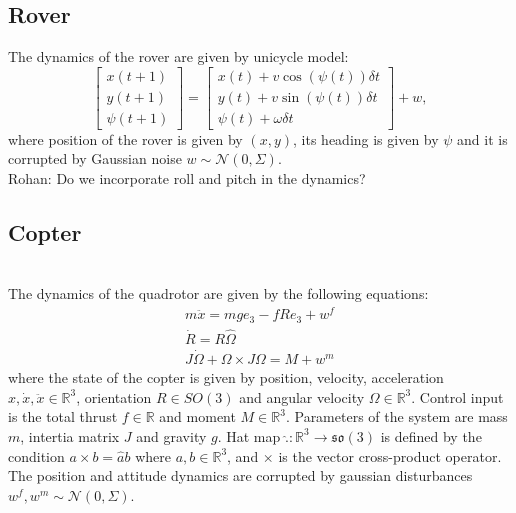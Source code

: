 \documentclass[conference]{IEEEtran}
\newcommand{\rohan}[1]{{\color{blue} Rohan: #1}}
\begin{document}
\subsection{Rover}
The dynamics of the rover are given by unicycle model:
\begin{equation}
    \begin{bmatrix}
        x(t+1) \\
        y(t+1) \\
        \psi(t+1)
    \end{bmatrix} = \begin{bmatrix}x(t) + v \cos(\psi(t)) \delta{t}\\ y(t) + v \sin(\psi(t)) \delta{t}\\ \psi(t) + \omega \delta{t} \end{bmatrix} + w,
\end{equation}
where position of the rover is given by $(x,y)$, its heading is given by $\psi$ and it is corrupted by Gaussian noise $w \sim \mathcal{N}(0,\Sigma)$. \\
\rohan{Do we incorporate roll and pitch in the dynamics?}

\subsection{Copter}
 \\
The dynamics of the quadrotor are given by the following equations:
\begin{gather}
m\ddot{x} = mge_{3} - fRe_{3} + w^f\\
\dot{R} = R\hat{\Omega} \\
J\dot{\Omega} + \Omega \times J\Omega = M + w^m
\end{gather}
where the state of the copter is given by position, velocity, acceleration $x, \dot{x}, \ddot{x} \in \mathbb{R}^3$, orientation $R \in SO(3)$ and angular velocity $\Omega \in \mathbb{R}^3$.
Control input is the total thrust $f \in \mathbb{R}$ and moment $M \in \mathbb{R}^3$.
Parameters of the system are mass $m$, intertia matrix $J$ and gravity $g$.
Hat map $\hat{.}: \mathbb{R}^3 \to \mathfrak{so}(3)$ is defined by the condition $a \times b = \hat{a}b$ where $a,b\in \mathbb{R}^3$, and $\times$ is the vector cross-product operator. The position and attitude dynamics are corrupted by gaussian disturbances  $w^f, w^m \sim \mathcal{N}(0,\Sigma)$. \\
\end{document}
